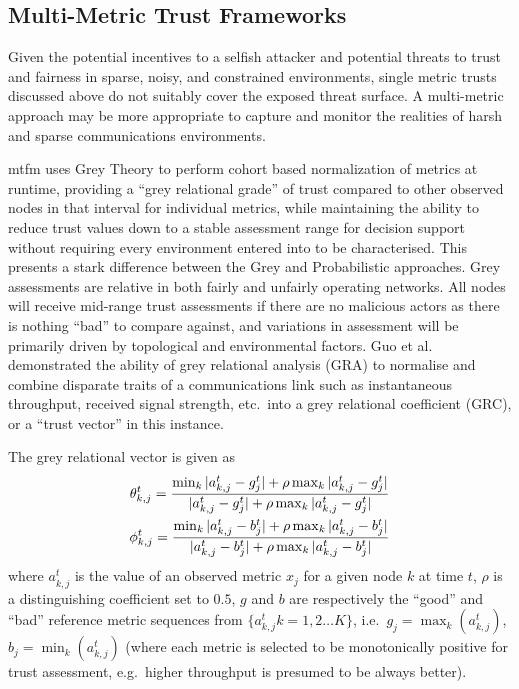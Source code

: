 \subsection{Multi-Metric Trust Frameworks}\label{sec:multimetrictrust}
Given the potential incentives to a selfish attacker and potential threats to trust and fairness in sparse, noisy, and constrained environments, single metric trusts discussed above do not suitably cover the exposed threat surface.
A multi-metric approach may be more appropriate to capture and monitor the realities of harsh and sparse communications environments.

\acrshort{mtfm}\cite{Guo11} uses Grey Theory\cite{Zuo1995} to perform cohort based normalization of metrics at runtime, providing a ``grey relational grade'' of trust compared to other observed nodes in that interval for individual metrics, while maintaining the ability to reduce trust values down to a stable assessment range for decision support without requiring every environment entered into to be characterised.
This presents a stark difference between the Grey and Probabilistic approaches.
Grey assessments are relative in both fairly and unfairly operating networks.
All nodes will receive mid-range trust assessments if there are no malicious actors as there is nothing ``bad'' to compare against, and variations in assessment will be primarily driven by topological and environmental factors.
Guo et al.\cite{Guo11} demonstrated the ability of grey relational analysis (GRA) to normalise and combine disparate traits of a communications link such as instantaneous throughput, received signal strength, etc.\ into a grey relational coefficient (GRC), or a ``trust vector'' in this instance.

The grey relational vector is given as
%
\begin{align}
  \label{eq:grc}
  \theta_{k,j}^t = \frac{\min_k|a_{k,j}^t - g_j^t| + \rho \max_k|a_{k,j}^t-g_j^t|}{|a_{k,j}^t-g_j^t| + \rho \max_k|a_{k,j}^t-g_j^t|} \\
  \phi_{k,j}^t = \frac{\min_k|a_{k,j}^t - b_j^t| + \rho \max_k|a_{k,j}^t-b_j^t|}{|a_{k,j}^t-b_j^t| + \rho \max_k|a_{k,j}^t-b_j^t|} \notag 
\end{align}
%
where $a_{k,j}^t$ is the value of an observed metric $x_j$ for a given node $k$ at time $t$, $\rho$ is a distinguishing coefficient set to $0.5$, $g$ and $b$ are respectively the ``good'' and ``bad'' reference metric sequences from $\{a_{k,j}^t k=1,2\dots K\}$, i.e.\ $g_j=\max_k({a_{k,j}^t})$,  $b_j=\min_k({a_{k,j}^t})$ (where each metric is selected to be monotonically positive for trust assessment, e.g.\ higher throughput is presumed to be always better).

